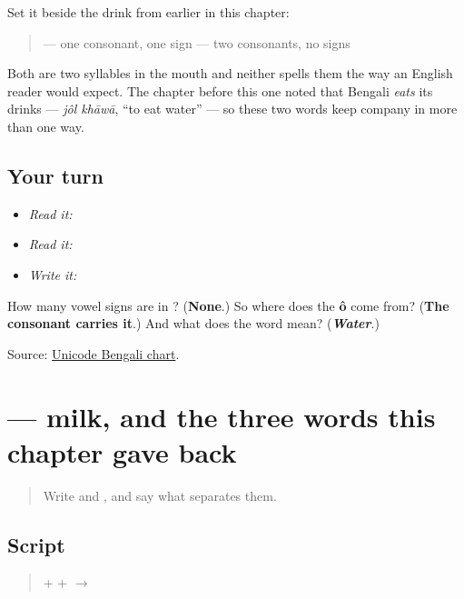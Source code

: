 Set it beside the drink from earlier in this chapter:

\begin{quote}
\textbf{} — one consonant, one sign \textbf{} — two consonants, no signs
\end{quote}

Both are two syllables in the mouth and neither spells them the way an English reader would expect. The chapter before this one noted that Bengali \emph{eats} its drinks — \emph{jôl khāwā}, \textquotedblleft{}to eat water\textquotedblright{} — so these two words keep company in more than one way.

\subsection*{Your turn}
\begin{itemize}
\raggedright
  \item \emph{Read it:} 
  \item \emph{Read it:}  
  \item \emph{Write it:} 
\end{itemize}

\begin{tcolorbox}[breakable,colback=teal!4,colframe=teal!35!black,title={Before you move on}]
How many vowel signs are in \textbf{}? (\textbf{None}.) So where does the \textbf{ô} come from? (\textbf{The consonant carries it}.) And what does the word mean? (\emph{\textbf{Water}}.)

Source: \href{https://www.unicode.org/charts/PDF/U0980.pdf}{Unicode Bengali chart}.
\end{tcolorbox}
\section[dudh]{ — milk, and the three words this chapter gave back}

\label{lesson:BN-W03-dudh-read}



\begin{quote}
Write \textbf{} and \textbf{}, and say what separates them.
\end{quote}

\subsection*{Script}
\begin{quote}
\textbf{} + \textbf{} + \textbf{} $\to$ \textbf{}
\end{quote}

